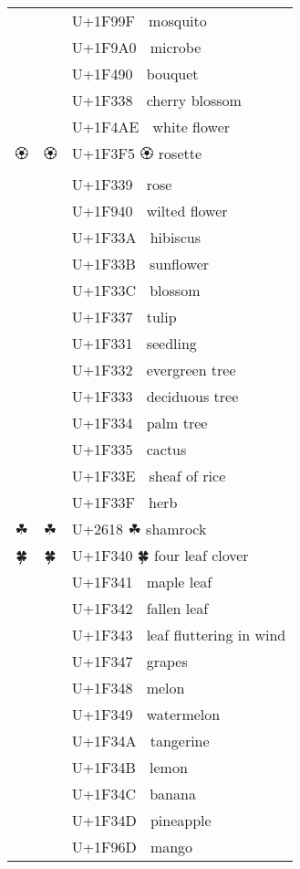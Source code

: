 \documentclass[a4paper,12pt]{article}
\newcommand{\fontA}[1]{{\fontspec[RawFeature={mode=harf,+dist,+ccmp}]{Segoe UI Emoji} #1}}
\newcommand{\fontB}[1]{{\fontspec[RawFeature={mode=harf,+dist,+ccmp}]{Noto Color Emoji} #1}}
\begin{document}
\begin{longtable}[c]{ccp{0.8\linewidth}}
\fontA{🦟}&\fontB{🦟}&U+1F99F 🦟 mosquito\\
\fontA{🦠}&\fontB{🦠}&U+1F9A0 🦠 microbe\\
\fontA{💐}&\fontB{💐}&U+1F490 💐 bouquet\\
\fontA{🌸}&\fontB{🌸}&U+1F338 🌸 cherry blossom\\
\fontA{💮}&\fontB{💮}&U+1F4AE 💮 white flower\\
\fontA{🏵}&\fontB{🏵}&U+1F3F5 🏵 rosette\\
\fontA{🌹}&\fontB{🌹}&U+1F339 🌹 rose\\
\fontA{🥀}&\fontB{🥀}&U+1F940 🥀 wilted flower\\
\fontA{🌺}&\fontB{🌺}&U+1F33A 🌺 hibiscus\\
\fontA{🌻}&\fontB{🌻}&U+1F33B 🌻 sunflower\\
\fontA{🌼}&\fontB{🌼}&U+1F33C 🌼 blossom\\
\fontA{🌷}&\fontB{🌷}&U+1F337 🌷 tulip\\
\fontA{🌱}&\fontB{🌱}&U+1F331 🌱 seedling\\
\fontA{🌲}&\fontB{🌲}&U+1F332 🌲 evergreen tree\\
\fontA{🌳}&\fontB{🌳}&U+1F333 🌳 deciduous tree\\
\fontA{🌴}&\fontB{🌴}&U+1F334 🌴 palm tree\\
\fontA{🌵}&\fontB{🌵}&U+1F335 🌵 cactus\\
\fontA{🌾}&\fontB{🌾}&U+1F33E 🌾 sheaf of rice\\
\fontA{🌿}&\fontB{🌿}&U+1F33F 🌿 herb\\
\fontA{☘}&\fontB{☘}&U+2618 ☘ shamrock\\
\fontA{🍀}&\fontB{🍀}&U+1F340 🍀 four leaf clover\\
\fontA{🍁}&\fontB{🍁}&U+1F341 🍁 maple leaf\\
\fontA{🍂}&\fontB{🍂}&U+1F342 🍂 fallen leaf\\
\fontA{🍃}&\fontB{🍃}&U+1F343 🍃 leaf fluttering in wind\\
\fontA{🍇}&\fontB{🍇}&U+1F347 🍇 grapes\\
\fontA{🍈}&\fontB{🍈}&U+1F348 🍈 melon\\
\fontA{🍉}&\fontB{🍉}&U+1F349 🍉 watermelon\\
\fontA{🍊}&\fontB{🍊}&U+1F34A 🍊 tangerine\\
\fontA{🍋}&\fontB{🍋}&U+1F34B 🍋 lemon\\
\fontA{🍌}&\fontB{🍌}&U+1F34C 🍌 banana\\
\fontA{🍍}&\fontB{🍍}&U+1F34D 🍍 pineapple\\
\fontA{🥭}&\fontB{🥭}&U+1F96D 🥭 mango\\

\end{longtable}
\end{document}
